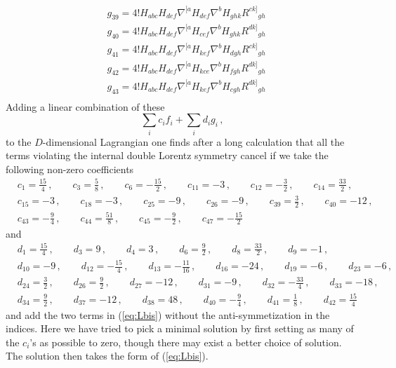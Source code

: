 \documentclass[a4paper,11pt]{article}
\begin{document}
\begin{equation}
\begin{aligned}
&g_{39}=4!H_{abc}H_{def}\nabla^{[a}H_{def}\nabla^bH_{ghk}R^{ck]}{}_{gh}\\
&g_{40}=4!H_{abc}H_{def}\nabla^{[a}H_{cef}\nabla^bH_{ghk}R^{dk]}{}_{gh}\\
&g_{41}=4!H_{abc}H_{def}\nabla^{[a}H_{kef}\nabla^bH_{dgh}R^{ck]}{}_{gh}\\
&g_{42}=4!H_{abc}H_{def}\nabla^{[a}H_{kce}\nabla^bH_{fgh}R^{dk]}{}_{gh}\\
&g_{43}=4!H_{abc}H_{def}\nabla^{[a}H_{kef}\nabla^bH_{cgh}R^{dk]}{}_{gh}\\
&{}
\end{aligned}
\end{equation}
Adding a linear combination of these
\begin{equation}
\sum_i c_if_i
+\sum_i d_ig_i\,,
\end{equation}
to the $D$-dimensional Lagrangian one finds after a long calculation that all the terms violating the internal double Lorentz symmetry cancel if we take the following non-zero coefficients
\begin{equation}
\begin{aligned}
&c_1=\frac{15}{4}\,,\qquad
c_3=\frac58\,,\qquad
c_6=-\frac{15}{2}\,,\qquad
c_{11}=-3\,,\qquad
c_{12}=-\frac32\,,\qquad
c_{14}=\frac{33}{2}\,,
\\
&c_{15}=-3\,,\qquad
c_{18}=-3\,,\qquad
c_{25}=-9\,,\qquad
c_{26}=-9\,,\qquad
c_{39}=\frac32\,,\qquad
c_{40}=-12\,,
\\
&c_{43}=-\frac94\,,\qquad
c_{44}=\frac{51}{8}\,,\qquad
c_{45}=-\frac92\,,\qquad
c_{47}=-\frac{15}{2}
\end{aligned}
\end{equation}
and
\begin{equation}
\begin{aligned}
&d_1=\frac{15}{4}\,,\qquad
d_3=9\,,\qquad
d_4=3\,,\qquad
d_6=\frac92\,,\qquad
d_8=\frac{33}{2}\,,\qquad
d_9=-1\,,
\\
&d_{10}=-9\,,\qquad
d_{12}=-\frac{15}{4}\,,\qquad
d_{13}=-\frac{11}{16}\,,\qquad
d_{16}=-24\,,\qquad
d_{19}=-6\,,\qquad
d_{23}=-6\,,
\\
&
d_{24}=\frac32\,,\qquad
d_{26}=\frac92\,,\qquad
d_{27}=-12\,,\qquad
d_{31}=-9\,,\qquad
d_{32}=-\frac{33}{4}\,,\qquad
d_{33}=-18\,,
\\
&
d_{34}=\frac92\,,\qquad
d_{37}=-12\,,\qquad
d_{38}=48\,,\qquad
d_{40}=-\frac94\,,\qquad
d_{41}=\frac18\,,\qquad
d_{42}=\frac{15}{4}
\end{aligned}
\end{equation}
and add the two terms in (\ref{eq:Lbis}) without the anti-symmetization in the indices. Here we have tried to pick a minimal solution by first setting as many of the $c_i$'s as possible to zero, though there may exist a better choice of solution. The solution then takes the form of (\ref{eq:Lbis}).
\end{document}
